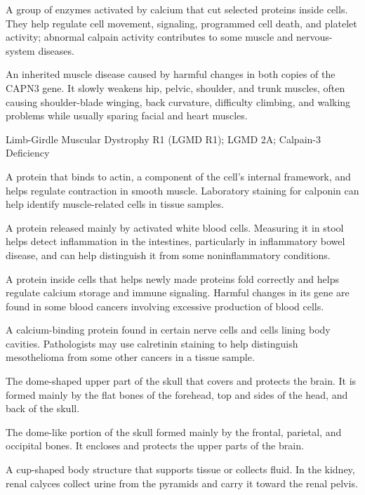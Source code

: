  A group of enzymes activated by calcium that cut selected proteins inside cells. They help regulate cell movement, signaling, programmed cell death, and platelet activity; abnormal calpain activity contributes to some muscle and nervous-system diseases.

 An inherited muscle disease caused by harmful changes in both copies of the CAPN3 gene. It slowly weakens hip, pelvic, shoulder, and trunk muscles, often causing shoulder-blade winging, back curvature, difficulty climbing, and walking problems while usually sparing facial and heart muscles.

\synonyms
Limb-Girdle Muscular Dystrophy R1 (LGMD R1); LGMD 2A; Calpain-3 Deficiency

 A protein that binds to actin, a component of the cell's internal framework, and helps regulate contraction in smooth muscle. Laboratory staining for calponin can help identify muscle-related cells in tissue samples.

 A protein released mainly by activated white blood cells. Measuring it in stool helps detect inflammation in the intestines, particularly in inflammatory bowel disease, and can help distinguish it from some noninflammatory conditions.

 A protein inside cells that helps newly made proteins fold correctly and helps regulate calcium storage and immune signaling. Harmful changes in its gene are found in some blood cancers involving excessive production of blood cells.

 A calcium-binding protein found in certain nerve cells and cells lining body cavities. Pathologists may use calretinin staining to help distinguish mesothelioma from some other cancers in a tissue sample.

 The dome-shaped upper part of the skull that covers and protects the brain. It is formed mainly by the flat bones of the forehead, top and sides of the head, and back of the skull.

 The dome-like portion of the skull formed mainly by the frontal, parietal, and occipital bones. It encloses and protects the upper parts of the brain.

 A cup-shaped body structure that supports tissue or collects fluid. In the kidney, renal calyces collect urine from the pyramids and carry it toward the renal pelvis.

